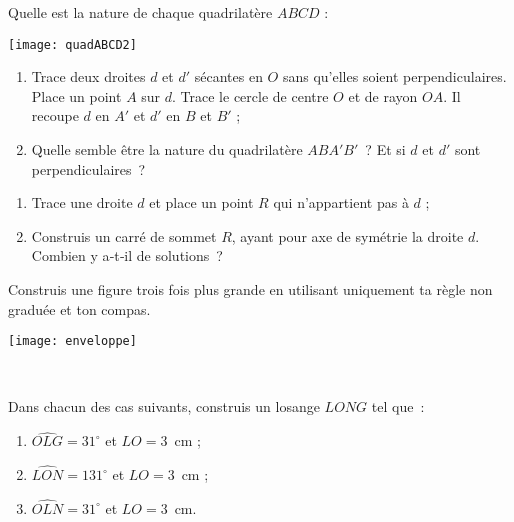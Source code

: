 \begin{exercice}[Reconnaître]
Quelle est la nature de chaque quadrilatère $ABCD$ :
\begin{center} \texttt{[image: quadABCD2]} \end{center}
\end{exercice}


\begin{exercice}
 \begin{enumerate}
  \item Trace deux droites $d$ et $d'$ sécantes en $O$ sans qu'elles soient perpendiculaires. Place un point $A$ sur $d$. Trace le cercle de centre $O$ et de rayon $OA$. Il recoupe $d$ en $A'$ et $d'$ en $B$ et $B'$ ;
  \item Quelle semble être la nature du quadrilatère $ABA'B'$ ? Et si $d$ et $d'$ sont perpendiculaires ?
  \end{enumerate}
\end{exercice}


\begin{exercice}
 \begin{enumerate}
  \item Trace une droite $d$ et place un point $R$ qui n'appartient pas à $d$ ;
  \item Construis un carré de sommet $R$, ayant pour axe de symétrie la droite $d$. Combien y a‑t‑il de solutions ?
  \end{enumerate}
\end{exercice}


\begin{exercice}
\begin{minipage}[c]{0.50\linewidth}
Construis une figure trois fois plus grande en utilisant uniquement ta règle non graduée et ton compas.
 \end{minipage} \hfill%
 \begin{minipage}[c]{0.42\linewidth}
  \texttt{[image: enveloppe]}
  \end{minipage} \\
\end{exercice}


\begin{exercice}
Dans chacun des cas suivants, construis un losange $LONG$ tel que :
\begin{enumerate}
 \item $\widehat{OLG} = 31^\circ$ et $LO = 3$ cm ;
 \item $\widehat{LON} = 131^\circ$ et $LO = 3$ cm ;
 \item $\widehat{OLN} = 31^\circ$ et $LO = 3$ cm.
 \end{enumerate}
\end{exercice}


